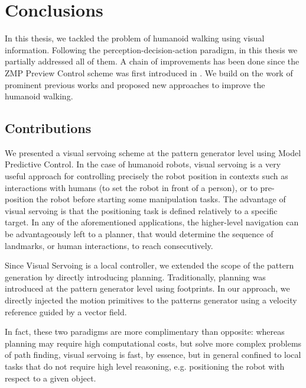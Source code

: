 
\chapter{Conclusions}
\label{Chap:Conclusions}

In this thesis, we tackled the problem of humanoid walking using visual information. Following the perception-decision-action paradigm, in this thesis we partially addressed all of them. A chain of improvements has been done since the ZMP Preview Control scheme was first introduced in \citep{Kajita2003}. We build on the work of prominent previous works and proposed new approaches to improve the humanoid walking.

\section{Contributions}

We presented a visual servoing scheme at the pattern generator level using Model Predictive Control. In the case of humanoid robots, visual servoing is a very useful approach for controlling precisely the robot position in contexts such as interactions with humans (to set the robot in front of a person), or to pre-position the robot before starting some manipulation tasks. The advantage of visual servoing is that the positioning task is defined relatively to a specific target. In any of the aforementioned applications, the higher-level navigation can be advantageously left to a planner, that would determine the sequence of landmarks, or human interactions, to reach consecutively. 

Since Visual Servoing is a local controller, we extended the scope of the pattern generation by directly introducing planning. Traditionally, planning was introduced at the pattern generator level using footprints. In our approach, we directly injected the motion primitives to the patterns generator using a velocity reference guided by a vector field.

In fact, these two paradigms are more complimentary than opposite: whereas planning may require high computational costs, but solve more complex problems of path finding, visual servoing is fast, by essence, but in general confined to local tasks that do not require high level reasoning, e.g. positioning the robot with respect to a given object.

